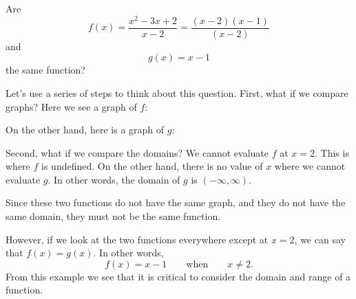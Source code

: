 \documentclass{ximera}
\begin{document}
\begin{example}
  Are 
  \[
  f(x) = \frac{x^2 - 3x + 2}{x-2} = \frac{(x-2)(x-1)}{(x-2)}
  \]
  and
  \[
  g(x) = x-1
  \]
  the same function?
  \begin{explanation}
  Let's use a series of steps to think about this question. 
    First, what if we compare graphs? Here we see a graph of
    $f$:
    \begin{image}
\end{image}
On the other hand, here is a graph of $g$:
\begin{image}
\end{image}
Second, what if we compare the domains?  We cannot evaluate $f$ at $x=2$.  This is
where $f$ is undefined.  On the other hand, there is no value of $x$ where we cannot evaluate $g$.
In other words, the domain of $g$ is $(-\infty, \infty)$.  

Since these two functions do not have the same graph, and they do not
have the same domain, they must not be the same function.

However, if we look at the two functions everywhere except at $x = 2$, 
we can say that $f(x)=g(x)$.  In other words, 
\[
f(x)=x-1\qquad\text{when}\qquad \text{$x \ne 2$}.
\]
From this example we see that it is critical to consider the domain and
range of a function.
  \end{explanation}
\end{example}
\end{document}

